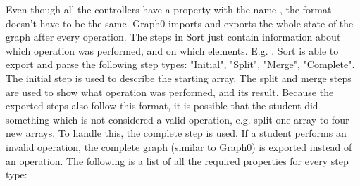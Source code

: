 Even though all the controllers have a property with the name , the format doesn't have to be the same. Graph0 imports and exports the whole state of the graph after every operation. The steps in Sort just contain information about which operation was performed, and on which elements. E.g. . Sort is able to export and parse the following step types: "Initial", "Split", "Merge", "Complete". The initial step is used to describe the starting array. The split and merge steps are used to show what operation was performed, and its result. Because the exported steps also follow this format, it is possible that the student did something which is not considered a valid operation, e.g. split one array to four new arrays. To handle this, the complete step is used. If a student performs an invalid operation, the complete graph (similar to Graph0) is exported instead of an operation. The following is a list of all the required properties for every step type:
